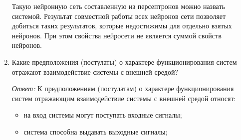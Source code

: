\documentclass[10pt]{article}
\begin{document}
\begin{enumerate}
  Такую нейронную сеть составленную из персептронов можно назвать системой. Результат совместной работы всех нейронов сети позволяет добиться таких результатов, которые недостижимы для отдельно взятых нейронов. При этом свойства нейросети не является суммой свойств нейронов.

\item{Какие предположения (постулаты) о характере функционирования систем отражают взаимодействие системы с внешней средой?}

  \emph{Ответ:} К предположениям (постулатам) о характере функционирования систем отражающим взаимодействие системы с внешней средой относят:

  \begin{itemize}
  \item{на вход системы могут поступать входные сигналы;}
  \item{система способна выдавать выходные сигналы;}
  \end{itemize}
\end{enumerate}
\end{document}
